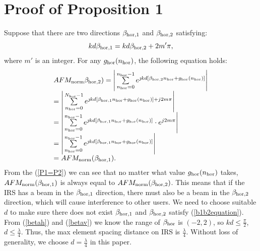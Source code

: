 \documentclass[12pt,draftclsnofoot,onecolumn]{IEEEtran}
\begin{document}
	
	\appendices
	
	\section{Proof of Proposition 1}\label{appendixB}
	Suppose that there are two directions $\beta_{{\rm hor},1}$ and $\beta_{{\rm hor},2}$ satisfying:
	\begin{equation}\label{b1b2equation}
		kd\beta_{{\rm hor},1}=kd\beta_{{\rm hor},2}+2m'\pi,
	\end{equation}
	where $m'$ is an integer. For any $g_{\rm hor}(n_{\rm hor})$,   the following equation holds:
	\begin{equation}\label{P1=P2}
		\begin{array}{l}
			AFM_{\rm norm}{\beta _{{\rm hor},2}}) = \Bigg|\sum\limits_{{n_{\rm hor}} = 0}^{n_{\rm hor} - 1} {{e^{{\jmath}kd[{\beta _{{\rm hor},2}}{n_{\rm hor}} + {g_{\rm hor}}({n_{\rm hor}})]}}} \Bigg|\\
			= \Bigg|\sum\limits_{{n_{\rm hor}} = 0}^{N_{\rm hor} - 1} {{e^{{\jmath}kd[{\beta _{{\rm hor},1}}{n_{\rm hor}} + {g_{\rm hor}}({n_{\rm hor}})] + j2m\pi }}\Bigg|} \\
			= \Bigg|\sum\limits_{{n_{\rm hor}} = 0}^{n_{\rm hor} - 1} {{e^{{\jmath}kd[{\beta _{{\rm hor},1}}{n_{\rm hor}} + {g_{\rm hor}}({n_{\rm hor}})]}}}\cdot {e^{j2m\pi }}\Bigg|\\
			= \Bigg|\sum\limits_{{n_{\rm hor}} = 0}^{n_{\rm hor} - 1} {{e^{{\jmath}kd[{\beta _{{\rm hor},1}}{n_{\rm hor}} + {g_{\rm hor}}({n_{\rm hor}})]}}} \Bigg|\\
			= AFM_{\rm norm}({\beta _{{\rm hor},1}}).
		\end{array}
	\end{equation}
	From the (\ref{P1=P2}) we can see that no matter what value $g_{\rm hor}(n_{\rm hor})$ takes, $AFM_{\rm norm}({\beta _{{\rm hor},1}})$ is always equal to $AFM_{\rm norm}({\beta _{{\rm hor},2}})$.  This means that if the IRS has a beam in the ${\beta _{{\rm hor},1}}$ direction, there must also be a beam in the ${\beta _{{\rm hor},2}}$ direction, which will cause interference to other users.  We need to choose suitable $d$ to make sure there does not exist $\beta_{{\rm hor},1}$ and $\beta_{{\rm hor},2}$ satisfy (\ref{b1b2equation}).  From (\ref{betah}) and (\ref{betav}) we know the range of ${\beta _{\rm hor}}$ is $(-2,2)$, so $kd\leq \frac{\pi}{2}$, $d \leq \frac{\lambda}{4}$. Thus, the max element spacing distance on IRS is $\frac{\lambda}{4}$. Without loss of generality, we choose $d=\frac{\lambda}{4}$ in this paper.
	
\end{document}
